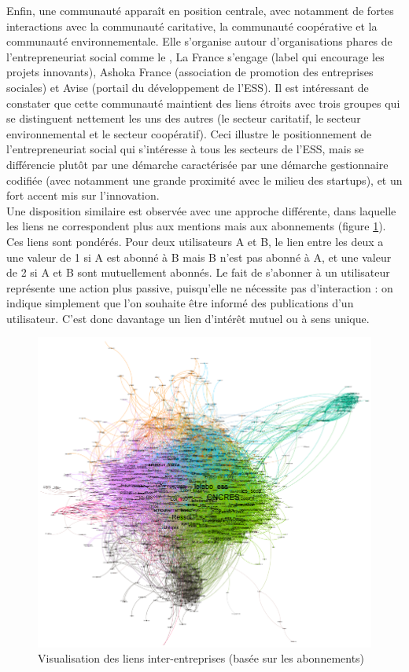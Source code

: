         Enfin, une communauté apparaît en position centrale, avec notamment de fortes interactions avec la communauté caritative, la communauté coopérative et la communauté environnementale. Elle s’organise autour d’organisations phares de l’entrepreneuriat social comme le \mouves, La France s’engage (label qui encourage les projets innovants), Ashoka France (association de promotion des entreprises sociales) et Avise (portail du développement de l’ESS). Il est intéressant de constater que cette communauté maintient des liens étroits avec trois groupes qui se distinguent nettement les uns des autres (le secteur caritatif, le secteur environnemental et le secteur coopératif). Ceci illustre le positionnement de l’entrepreneuriat social qui s’intéresse à tous les secteurs de l’ESS, mais se différencie plutôt par une démarche caractérisée par une démarche gestionnaire codifiée (avec notamment une grande proximité avec le milieu des startups), et un fort accent mis sur l’innovation. \\

        Une disposition similaire est observée avec une approche différente, dans laquelle les liens ne correspondent plus aux mentions mais aux abonnements (figure \ref{figure:reseauabos}). Ces liens sont pondérés. Pour deux utilisateurs A et B, le lien entre les deux a une valeur de 1 si A est abonné à B mais B n’est pas abonné à A, et une valeur de 2 si A et B sont mutuellement abonnés. Le fait de s’abonner à un utilisateur représente une action plus passive, puisqu’elle ne nécessite pas d’interaction : on indique simplement que l’on souhaite être informé des publications d’un utilisateur. C’est donc davantage un lien d’intérêt mutuel ou à sens unique.

        \begin{figure}
            \caption{Visualisation des liens inter-entreprises (basée sur les abonnements)}
            \label{figure:reseauabos}
            \includegraphics[width = \linewidth]{fig/fig3.png}
        \end{figure}

